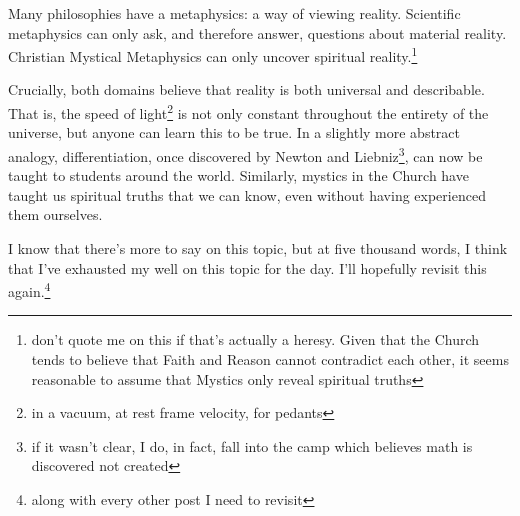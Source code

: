 \documentclass[12pt]{article}[titlepage]
\renewcommand{\,}{\textsuperscript{,}}
\begin{document}
Many philosophies have a metaphysics: a way of viewing reality.
Scientific metaphysics can only ask, and therefore answer, questions about material reality.
Christian Mystical Metaphysics can only uncover spiritual reality.\footnote{don't quote me on this if that's actually a heresy.
Given that the Church tends to believe that Faith and Reason cannot contradict each other, it seems reasonable to assume that Mystics only reveal spiritual truths}

Crucially, both domains believe that reality is both universal and describable.
That is, the speed of light\footnote{in a vacuum, at rest frame velocity, for pedants} is not only constant throughout the entirety of the universe, but anyone can learn this to be true.
In a slightly more abstract analogy, differentiation, once discovered by Newton and Liebniz\footnote{if it wasn't clear, I do, in fact, fall into the camp which believes math is discovered not created}, can now be taught to students around the world.
Similarly, mystics in the Church have taught us spiritual truths that we can know, even without having experienced them ourselves.

I know that there's more to say on this topic, but at five thousand words, I think that I've exhausted my well on this topic for the day.
I'll hopefully revisit this again.\footnote{along with every other post I need to revisit}
\end{document}
